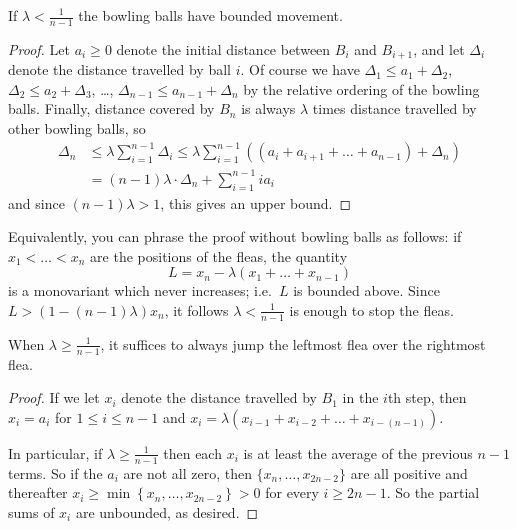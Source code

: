 \documentclass[11pt]{scrartcl}
\begin{document}
\begin{claim*}
  If $\lambda < \frac{1}{n-1}$
  the bowling balls have bounded movement.
\end{claim*}
\begin{proof}
  Let $a_i \ge 0$ denote the initial distance
  between $B_i$ and $B_{i+1}$,
  and let $\Delta_i$ denote the distance travelled by ball $i$.
  Of course we have
  $\Delta_1 \le a_1 + \Delta_2$,
  $\Delta_2 \le a_2 + \Delta_3$,
  \dots,
  $\Delta_{n-1} \le a_{n-1} + \Delta_n$
  by the relative ordering of the bowling balls.
  Finally, distance covered by $B_n$ is always
  $\lambda$ times distance travelled by other bowling balls, so
  \begin{align*}
    \Delta_n &\le \lambda \sum_{i=1}^{n-1} \Delta_i
    \le \lambda \sum_{i=1}^{n-1}
    \left( \left( a_i + a_{i+1} + \dots + a_{n-1} \right)
      + \Delta_n \right) \\
    &= (n-1)\lambda \cdot \Delta_n + \sum_{i=1}^{n-1} i a_i
  \end{align*}
  and since $(n-1)\lambda > 1$, this gives an upper bound.
\end{proof}

\begin{remark*}
  Equivalently, you can phrase the proof without
  bowling balls as follows:
  if $x_1 < \dots < x_n$ are the positions of the fleas,
  the quantity
  \[ L = x_n - \lambda(x_1 + \dots + x_{n-1}) \]
  is a monovariant which never increases;
  i.e.\ $L$ is bounded above.
  Since $L > (1-(n-1)\lambda) x_n$, it follows
  $\lambda < \frac{1}{n-1}$ is enough to stop the fleas.
\end{remark*}

\begin{claim*}
When $\lambda \ge \frac{1}{n-1}$,
it suffices to always jump the leftmost flea
over the rightmost flea.
\end{claim*}
\begin{proof}
If we let $x_i$ denote the distance travelled by $B_1$
in the $i$th step,
then $x_i = a_i$ for $1 \le i \le n-1$
and $x_i = \lambda(x_{i-1} + x_{i-2} + \dots + x_{i-(n-1)})$.

In particular, if $\lambda \ge \frac{1}{n-1}$
then each $x_i$ is at least the average of the previous $n-1$ terms.
So if the $a_i$ are not all zero,
then $\{x_{n}, \dots, x_{2n-2}\}$ are all positive
and thereafter $x_i \ge \min \left\{ x_n, \dots, x_{2n-2} \right\} > 0$
for every $i \ge 2n-1$.
So the partial sums of $x_i$ are unbounded, as desired.
\end{proof}
\end{document}
